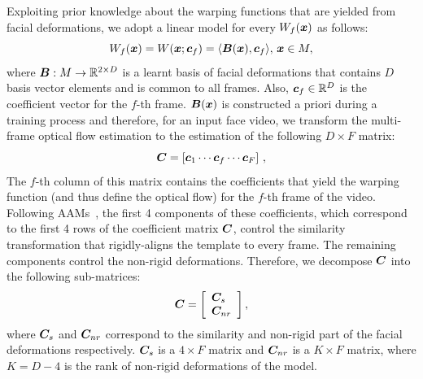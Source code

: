 Exploiting prior knowledge about the warping functions that are yielded from
facial deformations, we adopt a linear model for every $W_f(\boldsymbol{x})$ as follows:
\begin{equation}
    W_f(\boldsymbol{x}) = W(\boldsymbol{x};\boldsymbol{c}_f) = \langle \boldsymbol{B}(\boldsymbol{x}) , \boldsymbol{c}_f \rangle, \,\boldsymbol{x} \in M,
\end{equation}
where $\boldsymbol{B}:M\rightarrow \mathbb{R}^{2 \times D}$ is a learnt basis of facial deformations that
contains $D$ basis vector elements and is common to all frames. Also,
$\boldsymbol{c}_f\in\mathbb{R}^D$ is the coefficient vector for the $f$-th frame. $\boldsymbol{B}(\boldsymbol{x})$ is
constructed a priori during a training process and
therefore, for an input face video, we transform the multi-frame optical flow
estimation to the estimation of the following $D\times F$ matrix:
\begin{equation}
    \boldsymbol{C} = \left[ \boldsymbol{c}_1 \cdots \boldsymbol{c}_f \cdots \boldsymbol{c}_F \right] \,,
\end{equation}
The $f$-th column of this matrix contains the coefficients that yield the
warping function (and thus define the optical flow) for the $f$-th frame of the
video. Following AAMs~\cite{cootes2001active}, the first 4 components of these coefficients,
which correspond to the first 4 rows of the coefficient matrix $\boldsymbol{C}$,
control the similarity transformation that rigidly-aligns the template to every
frame. The remaining components control the non-rigid deformations.
Therefore, we decompose $\boldsymbol{C}$ into the following sub-matrices:
\begin{equation}\label{E:C_DEC}
    \boldsymbol{C} =
        \left[
            \begin{array}{l}
                \boldsymbol{C}_s\\
                \boldsymbol{C}_{nr}
            \end{array}
        \right],
\end{equation}
where $\boldsymbol{C}_s$ and $\boldsymbol{C}_{nr}$ correspond to the similarity and non-rigid
part of the facial deformations respectively.
$\boldsymbol{C}_s$ is a $4\times F$ matrix and $\boldsymbol{C}_{nr}$ is a $K \times F$ matrix,
where $K=D-4$ is the rank of non-rigid deformations of the model.
